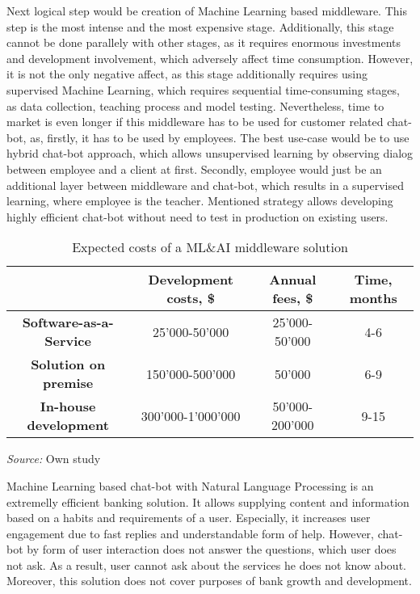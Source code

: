 Next logical step would be creation of Machine Learning based middleware.
This step is the most intense and the most expensive stage.
Additionally, this stage cannot be done parallely with other stages, as it requires enormous investments and development involvement, which adversely affect time consumption.
However, it is not the only negative affect, as this stage additionally requires using supervised Machine Learning, which requires sequential time-consuming stages, as data collection, teaching process and model testing.
Nevertheless, time to market is even longer if this middleware has to be used for customer related chat-bot, as, firstly, it has to be used by employees.
The best use-case would be to use hybrid chat-bot approach, which allows unsupervised learning by observing dialog between employee and a client at first.
Secondly, employee would just be an additional layer between middleware and chat-bot, which results in a supervised learning, where employee is the teacher.
Mentioned strategy allows developing highly efficient chat-bot without need to test in production on existing users.

\begin{table}
    \centering
    \begin{tabular}{| c | c | c | c |}
        \hline
        &
        \textbf{Development costs, \$} & 
        \textbf{Annual fees, \$} &
        \textbf{Time, months} \\ \hline 
       
        \textbf{Software-as-a-Service} & 
            25'000-50'000 & 
            25'000-50'000 &
            4-6 \\ \hline 
       
        \textbf{Solution on premise} & 
            150'000-500'000 &
            50'000 &
            6-9 \\ \hline 
            
        \textbf{In-house development} &
            300'000-1'000'000 &
            50'000-200'000 &
            9-15 \\ \hline
    \end{tabular}
    \caption{Expected costs of a ML\&AI middleware solution}
    \medskip
    \footnotesize\textit{Source:} Own study
\end{table}

Machine Learning based chat-bot with Natural Language Processing is an extremelly efficient banking solution.
It allows supplying content and information based on a habits and requirements of a user.
Especially, it increases user engagement due to fast replies and understandable form of help.
However, chat-bot by form of user interaction does not answer the questions, which user does not ask.
As a result, user cannot ask about the services he does not know about.
Moreover, this solution does not cover purposes of bank growth and development.

